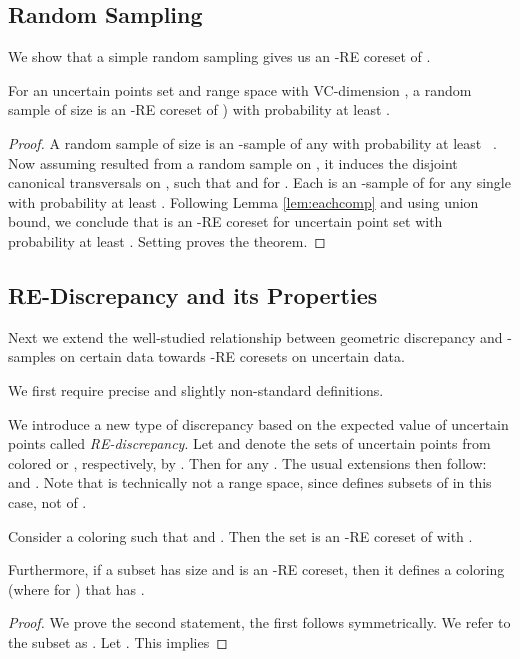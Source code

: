 \documentclass[11pt]{myclass}
\newcommand{\RE}{\textsf{RE}\xspace}
\begin{document}
\subsection{Random Sampling}
 We show that a simple random sampling gives us an -\RE coreset of .
  
\begin{theorem}
For an uncertain points set  and range space  with VC-dimension ,  a random sample  of size  is an -\RE coreset of ) with probability at least .
\label{thm:RE-samp}
\end{theorem}

\begin{proof} 
A random sample  of size  is an -sample of any  with probability at least  ~\cite{LLS01}.  Now assuming  resulted from a random sample on , it induces the  disjoint canonical transversals  on , such that  and  for .  
Each  is an -sample of  for any single  with probability at least . 
Following Lemma \ref{lem:eachcomp} and using union bound, we conclude that  is an -\RE coreset for uncertain point set  with probability at least .  Setting  proves the theorem.  
\end{proof}
 

\subsection{\RE-Discrepancy and its Properties}
\label{sec:RE-disc}
Next we extend the well-studied relationship between geometric discrepancy and -samples on certain data towards -\RE coresets on uncertain data.  

We first require precise and slightly non-standard definitions.
 
We introduce a new type of discrepancy based on the expected value of uncertain points called \emph{\RE-discrepancy}.  Let  and  denote the sets of uncertain points from  colored  or , respectively, by .  
Then  for any . 
The usual extensions then follow:
 and
.  
Note that  is technically not a range space, since  defines subsets of  in this case, not of .  


\begin{lemma}\label{lem:REcolor}
Consider a coloring  such that  and .  
Then the set  is an -\RE coreset of  with .

Furthermore, if a subset  has size  and is an -\RE coreset, then it defines a coloring  (where  for ) that has .  
\end{lemma}


\begin{proof}
We prove the second statement, the first follows symmetrically.  
We refer to the subset  as .  
Let  .  This implies  

\end{proof}
\end{document}
